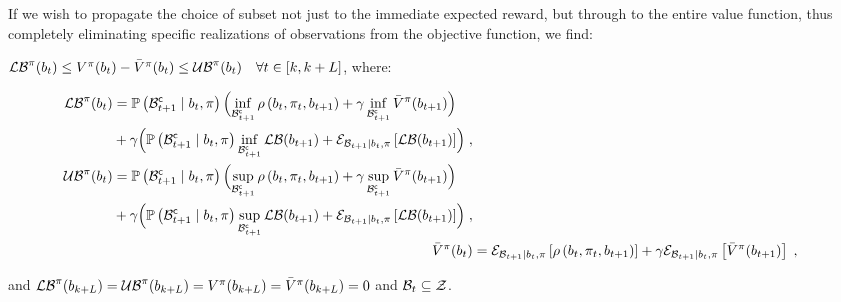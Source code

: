 If we wish to propagate the choice of subset not just to the immediate expected reward, but through to the entire value function, thus completely eliminating specific realizations of observations from the objective function, we find:
\begin{corollary}
	\label{thm:val_func_bounds_obs_bellman}
	$\lowerbound^\pi(\blf{t})\leq V^\pi(\blf{t})-\bar{V}^\pi(\blf{t})\leq\upperbound^\pi(\blf{t})\quad\forall t\in[k,k+L]$, where:
	\begin{small}
		\begin{subequations}
			\begin{align}
				\begin{split}
					\lowerbound\nolimits^\pi(\blf{t})&=\measure{\stcompI{\subSpace}{t+1}\mid\blf{t},\pi}\Bigl(\inf_{\stcompI{\subSpace}{t+1}}\reward{\blf{t},\pi_t,\blf{t+1}}+\gamma\inf_{\stcompI{\subSpace}{t+1}}\bar{V}^\pi(\blf{t+1})\Bigr)\\
					&+
					\gamma\Bigl(\measure{\stcompI{\subSpace}{t+1}\mid\blf{t},\pi}\inf_{\stcompI{\subSpace}{t+1}}\lowerbound(\blf{t+1})+\partialexpectation{\lowerbound(\blf{t+1})}{\subSpaceI{t+1}\mid\blf{t},\pi}\Bigr)\;,
				\end{split}\\
				\begin{split}
					\upperbound\nolimits^\pi(\blf{t})&=\measure{\stcompI{\subSpace}{t+1}\mid\blf{t},\pi}\Bigl(\sup_{\stcompI{\subSpace}{t+1}}\reward{\blf{t},\pi_t,\blf{t+1}}+\gamma\sup_{\stcompI{\subSpace}{t+1}}\bar{V}^\pi(\blf{t+1})\Bigr)\\
					&+
					\gamma\Bigl(\measure{\stcompI{\subSpace}{t+1}\mid\blf{t},\pi}\sup_{\stcompI{\subSpace}{t+1}}\lowerbound(\blf{t+1})+\partialexpectation{\lowerbound(\blf{t+1})}{\subSpaceI{t+1}\mid\blf{t},\pi}\Bigr)\;,
				\end{split}\\
				\bar{V}^\pi(\blf{t}) &=\partialexpectation{\reward{\blf{t},\pi_t,\blf{t+1}}}{\subSpaceI{t+1}\mid\blf{t},\pi}+\gamma\partialexpectation{\bar{V}^\pi(\blf{t+1})}{\subSpaceI{t+1}\mid\blf{t},\pi}\;,
			\end{align}
		\end{subequations}
	\end{small}
	and $\lowerbound^\pi(\blf{k+L})=\upperbound^\pi(\blf{k+L})=V^\pi(\blf{k+L})=\bar{V}^\pi(\blf{k+L})=0$ and $\subSpaceI{t}\subseteq\observationSpace$.
\end{corollary}
